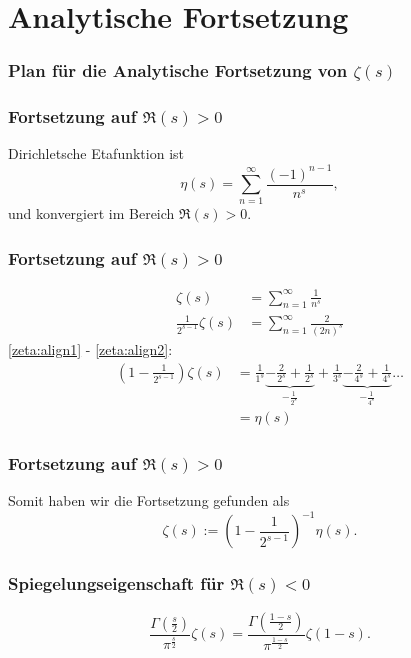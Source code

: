 \documentclass[ngerman, aspectratio=169]{beamer}
\begin{document}
    \section{Analytische Fortsetzung}
    \begin{frame}
        \frametitle{Plan für die Analytische Fortsetzung von $\zeta(s)$}
        \begin{center}
            
        \end{center}
    \end{frame}
    \begin{frame}
        \frametitle{Fortsetzung auf $\Re(s) > 0$}
        Dirichletsche Etafunktion ist
        \begin{equation*}\label{zeta:equation:eta}
            \eta(s)
            =
            \sum_{n=1}^{\infty}
            \frac{(-1)^{n-1}}{n^s},
        \end{equation*}
        und konvergiert im Bereich $\Re(s) > 0$.
    \end{frame}
    \begin{frame}
        \frametitle{Fortsetzung auf $\Re(s) > 0$}
        \begin{align}
            \zeta(s)
            &=
            \sum_{n=1}^{\infty}
            \frac{1}{n^s} \label{zeta:align1}
            \\
            \frac{1}{2^{s-1}}
            \zeta(s)
            &=
            \sum_{n=1}^{\infty}
            \frac{2}{(2n)^s} \label{zeta:align2}
        \end{align}
        \pause
        \eqref{zeta:align1} - \eqref{zeta:align2}:
        \begin{align*}
            \left(1 - \frac{1}{2^{s-1}} \right)
            \zeta(s)
            &=
            \frac{1}{1^s}
            \underbrace{-\frac{2}{2^s} + \frac{1}{2^s}}_{-\frac{1}{2^s}}
            + \frac{1}{3^s}
            \underbrace{-\frac{2}{4^s} + \frac{1}{4^s}}_{-\frac{1}{4^s}}
            \ldots
            \\
            &= \eta(s)
        \end{align*}
    \end{frame}
    \begin{frame}
        \frametitle{Fortsetzung auf $\Re(s) > 0$}
        Somit haben wir die Fortsetzung gefunden als
        \begin{equation} \label{zeta:equation:fortsetzung1}
            \zeta(s)
            :=
            \left(1 - \frac{1}{2^{s-1}} \right)^{-1} \eta(s).
        \end{equation}
    \end{frame}
    \begin{frame}
        \frametitle{Spiegelungseigenschaft für $\Re(s) < 0$}
        \begin{equation*}\label{zeta:equation:functional}
            \frac{\Gamma \left( \frac{s}{2} \right)}{\pi^{\frac{s}{2}}}
            \zeta(s)
            =
            \frac{\Gamma \left( \frac{1-s}{2} \right)}{\pi^{\frac{1-s}{2}}}
            \zeta(1-s).
        \end{equation*}
    \end{frame}
\end{document}
